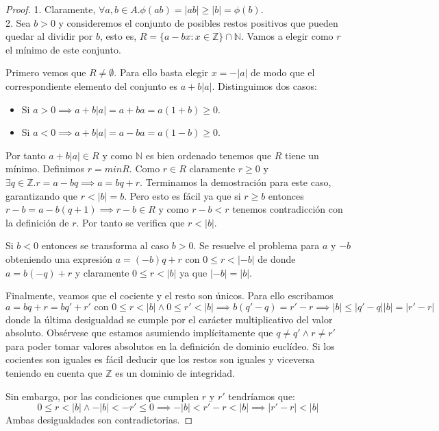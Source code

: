 \begin{proof}
	1. Claramente, $\forall a,b \in A. \phi(ab) = |ab| \ge |b| = \phi(b)$.\\
	2. Sea $b > 0$ y consideremos el conjunto de posibles restos positivos que pueden quedar al dividir por $b$, esto es, $R = \{a-bx:x\in \mathbb{Z}\} \cap \mathbb{N}$. Vamos a elegir como $r$ el mínimo de este conjunto. 
	
	Primero vemos que $R \neq \emptyset$. Para ello basta elegir $x = - |a|$ de modo que el correspondiente elemento del conjunto es $a + b|a|$. Distinguimos dos casos:
	
	\begin{itemize}
		\item Si $a > 0 \implies a+b|a| = a+ba = a(1+b) \ge 0$.
		\item Si $a < 0 \implies a+b|a| = a-ba = a(1-b) \ge 0$. 
	\end{itemize}
	
	Por tanto $a+b|a| \in R$ y como $\mathbb{N}$ es bien ordenado tenemos que $R$ tiene un mínimo. Definimos $r = min R$. Como $r \in R$ claramente $r \ge 0$ y $\exists q \in \mathbb{Z}. r = a-bq \implies a = bq + r$. Terminamos la demostración para este caso, garantizando que $r < |b| = b$. Pero esto es fácil ya que si $r \ge b$ entonces $r-b = a-b(q+1) \implies r-b \in R$ y como $r-b < r$ tenemos contradicción con la definición de $r$. Por tanto se verifica que $r < |b|$. 
	
	Si $b < 0$ entonces se transforma al caso $b > 0$. Se resuelve el problema para $a$ y $-b$ obteniendo una expresión $a = (-b)q+r$ con $0 \leq r < |-b|$ de donde $a = b(-q) + r$ y claramente $0 \leq r < |b|$ ya que $|-b| = |b|$. 
	
	Finalmente, veamos que el cociente y el resto son únicos.  Para ello escribamos $$a = bq + r = bq'+r' \text{ con } 0 \le r < |b| \land 0 \le r' < |b| \implies b(q'-q) = r' - r \implies |b| \le |q' - q||b| = |r'-r|$$ donde la última desigualdad se cumple por el carácter multiplicativo del valor absoluto. Obsérvese que estamos asumiendo implícitamente que $q \neq q' \land r \neq r'$ para poder tomar valores absolutos en la definición de dominio euclídeo. Si los cocientes son iguales es fácil deducir que los restos son iguales y viceversa teniendo en cuenta que $\mathbb{Z}$ es un dominio de integridad. 
	
	Sin embargo, por las condiciones que cumplen $r$ y $r'$ tendríamos que: $$0 \le r < |b| \land -|b| < -r' \le 0 \implies -|b| < r' - r < |b| \implies |r'-r| < |b|$$ Ambas desigualdades son contradictorias.
\end{proof}

